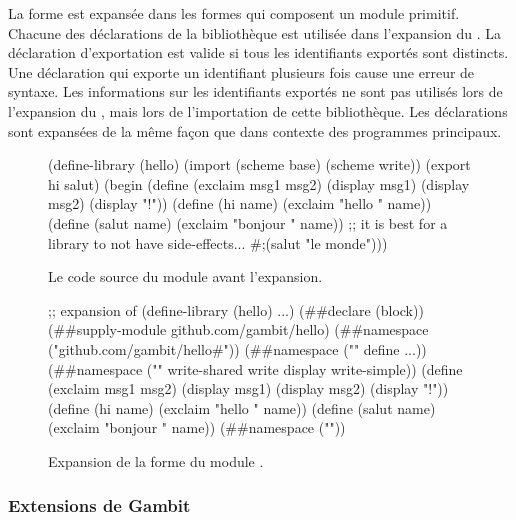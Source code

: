 La forme  est expansée dans les formes qui composent un
module primitif. Chacune des déclarations de la bibliothèque est utilisée dans
l'expansion du . La déclaration d'exportation est
valide si tous les identifiants exportés sont distincts. Une déclaration
 qui exporte un identifiant plusieurs fois cause une erreur de
syntaxe. Les informations sur les identifiants exportés ne sont pas utilisés lors de
l'expansion du , mais lors de l'importation de cette
bibliothèque.  Les déclarations  sont expansées de la même
façon que dans contexte des programmes principaux.\\

\begin{figure}[ht]
  \centering
\begin{mplisting}{0.9}
(define-library (hello)
  (import (scheme base) (scheme write))
  (export hi salut)
  (begin
    (define (exclaim msg1 msg2)
      (display msg1)
      (display msg2)
      (display "!\n"))
    (define (hi name) (exclaim "hello " name))
    (define (salut name) (exclaim "bonjour " name))
    ;; it is best for a library to not have side-effects...
    #;(salut "le monde")))
\end{mplisting}
  \caption{Le code source du module
     avant l'expansion.}
  \label{fig:define-library->expand}
\end{figure}
  \vspace*{4ex}
\begin{figure}[ht]
  \centering
  \begin{mplisting}{0.9}
;; expansion of (define-library (hello) ...)
(##declare (block))
(##supply-module github.com/gambit/hello)
(##namespace ("github.com/gambit/hello#"))
(##namespace ("" define ...))
(##namespace ("" write-shared write display write-simple))
(define (exclaim msg1 msg2)
    (display msg1) (display msg2) (display "!\n"))
(define (hi name) (exclaim "hello " name))
(define (salut name) (exclaim "bonjour " name))
(##namespace (""))
\end{mplisting}
  \caption{Expansion de la forme 
    du module .}
  \label{fig:define-library->expand-after}
\end{figure}

\subsubsection{Extensions de Gambit}

